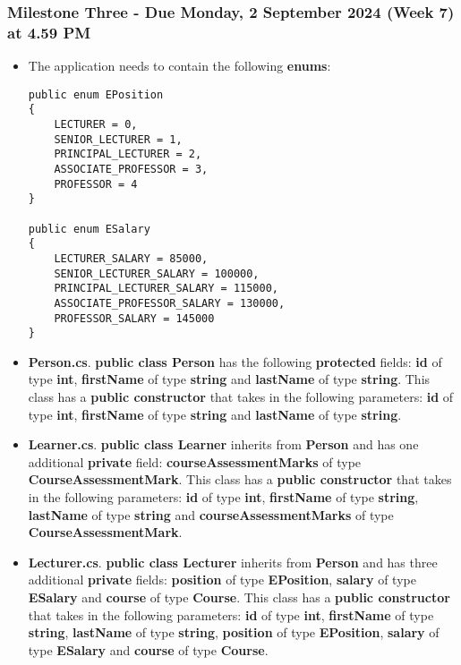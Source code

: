 \documentclass{article}
\begin{document}
\subsubsection*{Milestone Three - Due Monday, 2 September 2024 (Week 7) at 4.59 PM}

\begin{itemize}
    \item The application needs to contain the following \textbf{enums}:
    \begin{verbatim}
public enum EPosition
{
    LECTURER = 0,
    SENIOR_LECTURER = 1,
    PRINCIPAL_LECTURER = 2,
    ASSOCIATE_PROFESSOR = 3,
    PROFESSOR = 4
}
            
public enum ESalary
{
    LECTURER_SALARY = 85000,
    SENIOR_LECTURER_SALARY = 100000,
    PRINCIPAL_LECTURER_SALARY = 115000,
    ASSOCIATE_PROFESSOR_SALARY = 130000,
    PROFESSOR_SALARY = 145000
}
    \end{verbatim}
    \item \textbf{Person.cs}. \textbf{public class Person} has the following \textbf{protected} fields: \textbf{id} of type \textbf{int}, \textbf{firstName} of type \textbf{string} and \textbf{lastName} of type \textbf{string}. This class has a \textbf{public constructor} that takes in the following parameters: \textbf{id} of type \textbf{int}, \textbf{firstName} of type \textbf{string} and \textbf{lastName} of type \textbf{string}.
    \item \textbf{Learner.cs}. \textbf{public class Learner} inherits from \textbf{Person} and has one additional \textbf{private} field: \textbf{courseAssessmentMarks} of type \textbf{CourseAssessmentMark}. This class has a \textbf{public constructor} that takes in the following parameters: \textbf{id} of type \textbf{int}, \textbf{firstName} of type \textbf{string}, \textbf{lastName} of type \textbf{string} and \textbf{courseAssessmentMarks} of type \textbf{CourseAssessmentMark}. 
    \item \textbf{Lecturer.cs}. \textbf{public class Lecturer} inherits from \textbf{Person} and has three additional \textbf{private} fields: \textbf{position} of type \textbf{EPosition}, \textbf{salary} of type \textbf{ESalary} and \textbf{course} of type \textbf{Course}. This class has a \textbf{public constructor} that takes in the following parameters: \textbf{id} of type \textbf{int}, \textbf{firstName} of type \textbf{string}, \textbf{lastName} of type \textbf{string}, \textbf{position} of type \textbf{EPosition}, \textbf{salary} of type \textbf{ESalary} and \textbf{course} of type \textbf{Course}. 
\end{itemize}
\end{document}
